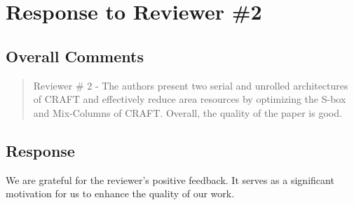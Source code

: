 \section{Response to Reviewer \#2}
\subsection*{Overall Comments}
\begin{mdframed}
\begin{quote}
	 Reviewer \# 2 - The authors present two serial and unrolled architectures of CRAFT and effectively reduce area resources by optimizing the S-box and Mix-Columns of CRAFT. Overall, the quality of the paper is good.
\end{quote}
\end{mdframed}

\subsection{Response} 

We are grateful for the reviewer's positive feedback. It serves as a significant motivation for us to enhance the quality of our work.

